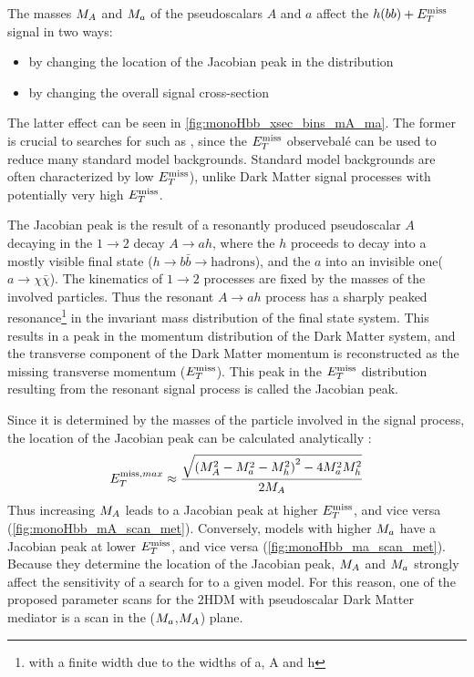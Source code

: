 The masses $M_{A}$ and $M_{a}$ of the pseudoscalars $A$ and $a$ affect the $h(bb)+E_T^\mathrm{miss}$ signal in two ways: 
\begin{itemize}
\item by changing the location of the Jacobian peak in the \MET distribution 
\item by changing the overall signal cross-section
\end{itemize}
The latter effect can be seen in \autoref{fig:monoHbb_xsec_bins_mA_ma}. The former is crucial to searches for \monohbb such as  \cite{Aaboud:2017yqz},
since the $E_T^\mathrm{miss}$ observebalé can be used to reduce many standard model backgrounds. 
Standard model backgrounds  are often characterized by low  $E_T^\mathrm{miss}$), unlike Dark Matter signal processes with potentially very high $E_T^\mathrm{miss}$.

The Jacobian peak is the result of a resonantly produced pseudoscalar $A$ decaying in the $1 \rightarrow 2$ decay $A\rightarrow a h$, 
where the $h$ proceeds to decay into a mostly visible final state ($h\rightarrow b \bar{b} \rightarrow \mathrm{hadrons}$), 
and the $a$ into an invisible one($a\rightarrow \chi\bar{\chi}$).
The kinematics of  $1\rightarrow 2$ processes are fixed by the masses of the involved particles.
Thus the resonant $A \rightarrow a h $  process has a sharply peaked resonance\footnote{with a finite width due to the widths of a, A and h} 
in the invariant mass distribution of the final state system. This results in a  peak in the momentum distribution of the Dark Matter system,
and the transverse component of the Dark Matter momentum is reconstructed as the missing transverse momentum ($E_T^\mathrm{miss}$).
This peak in the $E_T^\mathrm{miss}$ distribution resulting from the resonant signal process  is called the Jacobian peak.

Since it is determined by the masses of the particle involved in the signal process, 
the location of the Jacobian peak can be calculated analytically \cite{Bauer:2017ota}:
\begin{align}
E^{\mathrm{miss},max}_T \approx \frac{\sqrt{\left(M_{A}^2 -M_{a}^2 -M_{h}^2\right)^2 - 4 M_{a}^2 M_{h}^2}}{2M_{A}}  \label{eq:monoH_peak_met}
\end{align}
Thus increasing $M_{A}$ leads to a Jacobian peak at higher $E_T^\mathrm{miss}$, and vice versa (\autoref{fig:monoHbb_mA_scan_met}).
Conversely, models with higher $M_{a}$ have a Jacobian peak at lower $E_T^\mathrm{miss}$, and vice versa (\autoref{fig:monoHbb_ma_scan_met}). 
Because they determine the location of the Jacobian peak, $M_{A}$ and $M_{a}$ strongly affect the sensitivity of a search for \monohbb to a given model.
For this reason, one of the proposed parameter scans for the 2HDM with pseudoscalar Dark Matter  mediator is a scan in the ($M_{a}$,$M_{A}$) plane.

